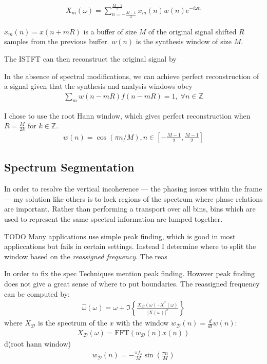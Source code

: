 \documentclass[12pt]{article}
\newcommand{\fft}{\text{FFT}}
\begin{document}
\begin{align}
  X_m(\omega) = 
  \sum_{n = -\frac{M-1}{2}}^{\frac{M - 1}{2}} 
  x_m(n)w(n)e^{-i\omega n}
\end{align}

$x_m(n) = x(n + mR)$ 
is a buffer of size $M$ of the original signal
shifted $R$ samples from the previous buffer.
$w(n)$ is the synthesis window of size $M$.

The ISTFT can then reconstruct the
original signal by


In the absence of spectral modifications, 
we can achieve perfect reconstruction 
of a signal given that the synthesis and analysis windows obey
\begin{align}
  \sum_m w(n - mR)f(n - mR) = 1,\; \forall n\in \mathbb{Z}
\end{align}

I chose to use the root Hann window, which gives perfect reconstruction when $R = \frac{M}{2k}$ for $k\in\mathbb{Z}$.
\begin{align*}
  w(n) = 
  \cos(\pi n / M), 
  n\in
  \left[
  -\frac{M-1}{2}, 
  \frac{M-1}{2}
\right]
\end{align*}

\subsection{Spectrum Segmentation}

In order to resolve the vertical incoherence --- the phasing issues within the frame --- my solution like others is to lock regions of the spectrum where phase relations are important. Rather than performing a transport over all bins, bins which are used to represent the same spectral information are lumped together. 

TODO
Many applications use simple peak finding, which is good in most appliccations but fails in certain settings.
Instead I determine where to split the window based on the \emph{reassigned frequency}.
The reas


In order to fix the spec
Techniques mention peak finding.
However peak finding does not give a great sense of where to put boundaries. 
The reassigned frequency can be computed by:
\begin{align}
  \hat{\omega}(\omega) = 
  \omega + 
  \Im\left\{%
    \frac{X_\mathcal{D}(\omega)\cdot X^*(\omega)}{|X(\omega)|^2}
  \right\}
\end{align}
where $X_\mathcal{D}$ is the spectrum of the $x$ with the window
$w_\mathcal{D}(n) = \frac{d}{dt}w(n)$:
\begin{align}
  X_\mathcal{D}(\omega) = \fft\left(w_\mathcal{D}(n)x(n)\right)
\end{align}
d(root hann window)
\begin{align*}
   w_\mathcal{D}(n) = -\frac{\pi f_s}{M}\sin\left(\frac{\pi n}{M}\right)
\end{align*}
\end{document}
